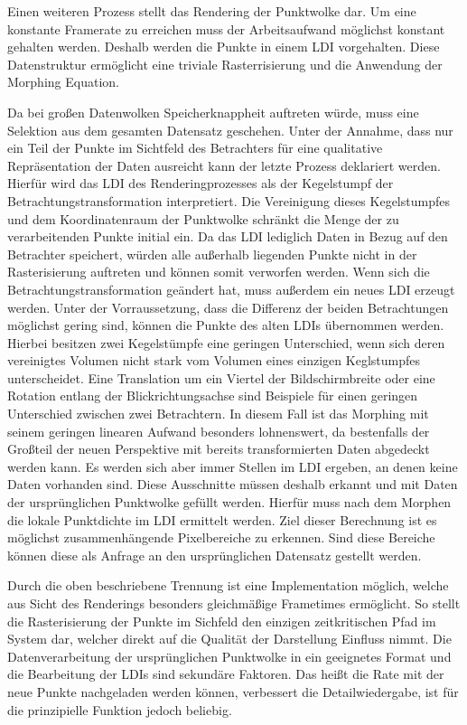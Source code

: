 \documentclass[hyperref, beleg, german]{cgvpub}
\begin{document}
Einen weiteren Prozess stellt das Rendering der Punktwolke dar. Um eine
konstante Framerate zu erreichen muss der Arbeitsaufwand möglichst konstant
gehalten werden. Deshalb werden die Punkte in einem LDI vorgehalten. Diese
Datenstruktur ermöglicht eine triviale Rasterrisierung und die Anwendung der
Morphing Equation.

Da bei großen Datenwolken Speicherknappheit auftreten würde, muss eine
Selektion aus dem gesamten Datensatz geschehen. Unter der Annahme, dass nur ein
Teil der Punkte im Sichtfeld des Betrachters für eine qualitative
Repräsentation der Daten ausreicht kann der letzte Prozess deklariert werden.
Hierfür wird das LDI des Renderingprozesses als der Kegelstumpf der
Betrachtungstransformation interpretiert. Die Vereinigung dieses Kegelstumpfes
und dem Koordinatenraum der Punktwolke schränkt die Menge der zu verarbeitenden
Punkte initial ein. Da das LDI lediglich Daten in Bezug auf den Betrachter
speichert, würden alle außerhalb liegenden Punkte nicht in der Rasterisierung
auftreten und können somit verworfen werden. Wenn sich die
Betrachtungstransformation geändert hat, muss außerdem ein neues LDI erzeugt
werden. Unter der Vorraussetzung, dass die Differenz der beiden Betrachtungen
möglichst gering sind, können die Punkte des alten LDIs übernommen werden.
Hierbei besitzen zwei Kegelstümpfe eine geringen Unterschied, wenn sich deren
vereinigtes Volumen nicht stark vom Volumen eines einzigen Keglstumpfes
unterscheidet. Eine Translation um ein Viertel der Bildschirmbreite oder eine
Rotation entlang der Blickrichtungsachse sind Beispiele für einen geringen
Unterschied zwischen zwei Betrachtern. In diesem Fall ist das Morphing mit
seinem geringen linearen Aufwand besonders lohnenswert, da bestenfalls der
Großteil der neuen Perspektive mit bereits transformierten Daten abgedeckt
werden kann. Es werden sich aber immer Stellen im LDI ergeben, an denen keine
Daten vorhanden sind. Diese Ausschnitte müssen deshalb erkannt und mit Daten
der ursprünglichen Punktwolke gefüllt werden. Hierfür muss nach dem Morphen die
lokale Punktdichte im LDI ermittelt werden. Ziel dieser Berechnung ist es
möglichst zusammenhängende Pixelbereiche zu erkennen. Sind diese Bereiche
können diese als Anfrage an den ursprünglichen Datensatz gestellt werden.

Durch die oben beschriebene Trennung ist eine Implementation möglich, welche
aus Sicht des Renderings besonders gleichmäßige Frametimes ermöglicht. So
stellt die Rasterisierung der Punkte im Sichfeld den einzigen zeitkritischen
Pfad im System dar, welcher direkt auf die Qualität der Darstellung Einfluss
nimmt. Die Datenverarbeitung der ursprünglichen Punktwolke in ein geeignetes
Format und die Bearbeitung der LDIs sind sekundäre Faktoren. Das heißt die Rate
mit der neue Punkte nachgeladen werden können, verbessert die Detailwiedergabe,
ist für die prinzipielle Funktion jedoch beliebig.
\end{document}
